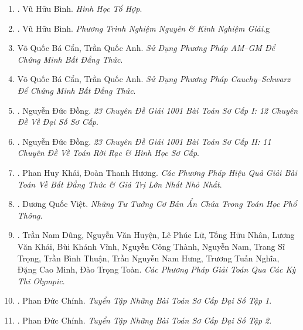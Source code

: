 \documentclass{article}
\begin{document}
\begin{enumerate}
	\item \cite{Binh_HHTH}. {\sc Vũ Hữu Bình}. {\it Hình Học Tổ Hợp}.\hfill{\sf[reading]}

	\item \cite{Binh_PTNN}. {\sc Vũ Hữu Bình}. {\it Phương Trình Nghiệm Nguyên \& Kinh Nghiệm Giải}.g\hfill{\sf[reading]}

	\item {\sc Võ Quốc Bá Cẩn, Trần Quốc Anh}. {\it Sử Dụng Phương Pháp AM--GM Để Chứng Minh Bất Đẳng Thức}.

	\item {\sc Võ Quốc Bá Cẩn, Trần Quốc Anh}. {\it Sử Dụng Phương Pháp Cauchy--Schwarz Để Chứng Minh Bất Đẳng Thức}.

	\item \cite{Dong_23_1001_toan_I}. Nguyễn Đức Đồng. {\it 23 Chuyên Đề Giải 1001 Bài Toán Sơ Cấp I: 12 Chuyên Đề Về Đại Số Sơ Cấp}.\hfill{\sf[reading]}

	\item \cite{Dong_23_1001_toan_II}. Nguyễn Đức Đồng. {\it 23 Chuyên Đề Giải 1001 Bài Toán Sơ Cấp II: 11 Chuyên Đề Về Toán Rời Rạc \& Hình Học Sơ Cấp}.\hfill{\sf[reading]}

	\item \cite{Khai_Huong_bdt}. Phan Huy Khải, Đoàn Thanh Hương. {\it Các Phương Pháp Hiệu Quả Giải Bài Toán Về Bất Đẳng Thức \& Giá Trị Lớn Nhất Nhỏ Nhất}.\hfill{\sf[reading]}

	\item \cite{Viet2014}. Dương Quốc Việt. {\it Những Tư Tưởng Cơ Bản Ẩn Chứa Trong Toán Học Phổ Thông}.\hfill{\sf[done]}

	\item \cite{Dung_cac_phuong_phap_giai_toan_qua_cac_ky_thi_olympic_2022}. Trần Nam Dũng, Nguyễn Văn Huyện, Lê Phúc Lữ, Tống Hữu Nhân, Lương Văn Khải, Bùi Khánh Vĩnh, Nguyễn Công Thành, Nguyễn Nam, Trang Sĩ Trọng, Trần Bình Thuận, Trần Nguyễn Nam Hưng, Trương Tuấn Nghĩa, Đặng Cao Minh, Đào Trọng Toàn. {\it Các Phương Pháp Giải Toán Qua Các Kỳ Thi Olympic}.\hfill{\sf[reading]}

	\item \cite{Chinh2021_tap_1}. Phan Đức Chính. {\it Tuyển Tập Những Bài Toán Sơ Cấp Đại Số Tập 1}.\hfill{\sf[reading]}

	\item \cite{Chinh2021_tap_2}. Phan Đức Chính. {\it Tuyển Tập Những Bài Toán Sơ Cấp Đại Số Tập 2}.\hfill{\sf[reading]}


\end{enumerate}
\end{document}

